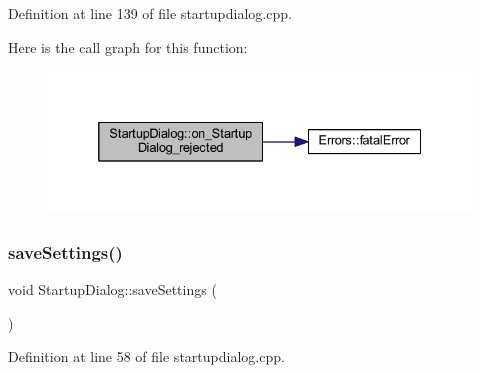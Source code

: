 Definition at line 139 of file startupdialog.\+cpp.

Here is the call graph for this function\+:
\nopagebreak
\begin{figure}[H]
\begin{center}
\leavevmode
\includegraphics[width=332pt]{classStartupDialog_a49bcc6d2a28e82654ab583aba08f0ba5_cgraph}
\end{center}
\end{figure}
\mbox{\label{classStartupDialog_a2c474c7787e0ea42958cb48f12f4e5c7}} 
\subsubsection{\texorpdfstring{saveSettings()}{saveSettings()}}
{\footnotesize\ttfamily void Startup\+Dialog\+::save\+Settings (\begin{DoxyParamCaption}{ }\end{DoxyParamCaption})\hspace{0.3cm}{\ttfamily [private]}}



Definition at line 58 of file startupdialog.\+cpp.

